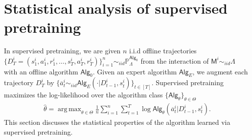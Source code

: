 \documentclass[10pt]{article}
\DeclareMathOperator*{\argmax}{arg\,max}
\newcommand{\<}{\left\langle}
\renewcommand{\>}{\right\rangle}
\renewcommand{\P}{\mathbb{P}}
\newcommand{\inst}{{\mathsf{M}}}
\newcommand{\widebar}[1]{\overline{#1}}
\newcommand{\state}{{s}}
\newcommand{\action}{{a}}
\newcommand{\eaction}{{\widebar{a}}}
\newcommand{\reward}{{r}}
\newcommand{\totlen}{{T}}
\newcommand{\ith}{{i}}
\newcommand{\sAlg}{{\mathsf{Alg}}}
\newcommand{\dset}{{D}}
\newcommand{\Numobs}{{n}}
\newcommand{\Par}{{\theta}}
\newcommand{\Parspace}{{\Theta}}
\newcommand{\EstPar}{{\widehat{\theta}}}
\newcommand{\prior}{{\Lambda}}
\newcommand{\shortexp}{{E}}
\begin{document}
\section{Statistical analysis of supervised pretraining}\label{sec:supervised-pretraining}
In supervised pretraining, we are given $\Numobs$ i.i.d offline trajectories $\{\dset^\ith_\totlen =  (\state^\ith_1,\action^\ith_1, \reward^\ith_1, \ldots, \state^\ith_\totlen, \allowbreak \action^\ith_\totlen, \allowbreak\reward^\ith_\totlen) \}_{i=1}^\Numobs \sim_{iid} \P_\prior^{\sAlg_0}$ from the interaction of $\inst^\ith \sim_{iid} \prior$ with an offline algorithm $\sAlg_0$. Given an expert algorithm $\sAlg_{\shortexp}$, we augment each trajectory $\dset_{\totlen}^i$ by $\{ \eaction_t^i \sim_{iid} \sAlg_{\shortexp}( \cdot |\dset_{t-1}^i, \state_t^i)\}_{t \in [\totlen]}$. Supervised pretraining maximizes the log-likelihood over the algorithm class $\{ \sAlg_\Par\}_{\Par\in\Parspace}$
\begin{align}
\EstPar=\argmax_{\Par\in\Parspace}  \frac{1}{\Numobs}\sum_{i=1}^\Numobs\sum_{t=1}^\totlen\log \sAlg_\Par(\eaction^\ith_{t}|\dset_{t-1}^\ith,\state^\ith_t). \label{eq:general_mle}
\end{align}
This section discusses the statistical properties of the algorithm learned via supervised pretraining.
\end{document}
